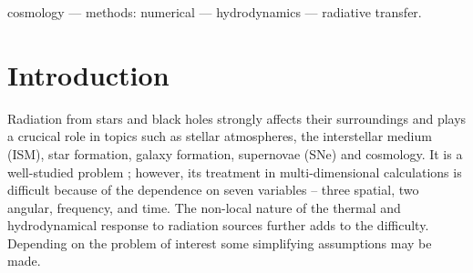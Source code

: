 \documentclass[useAMS,usenatbib]{mn2e}
\begin{document}
\begin{keywords}
  cosmology --- methods: numerical --- hydrodynamics --- radiative
  transfer.
\end{keywords}

\section{Introduction}

Radiation from stars and black holes strongly affects their
surroundings and plays a crucical role in topics such as stellar
atmospheres, the interstellar medium (ISM), star formation, galaxy
formation, supernovae (SNe) and cosmology.  It is a well-studied
problem \citep[e.g.][]{Mathews65, Rybicki, Mihalas84, Yorke86};
however, its treatment in multi-dimensional calculations is difficult
because of the dependence on seven variables -- three spatial, two
angular, frequency, and time.  The non-local nature of the thermal and
hydrodynamical response to radiation sources further adds to the
difficulty.  Depending on the problem of interest some simplifying
assumptions may be made.
\end{document}
